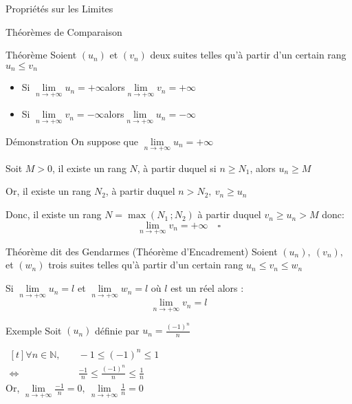 \documentclass{cours}
\begin{document}
    \begin{Gpartie}{Propriétés sur les Limites} 
        \begin{Spartie}{Théorèmes de Comparaison} 
            \begin{SSpartie}{Théorème} 
                Soient $(u_n)$ et $(v_n)$ deux suites telles qu'à partir d'un certain rang $u_n\leq v_n$
                \begin{itemize}
                    \setlength\itemsep{0.5em}
                    \item Si $\lim\limits_{n\to +\infty}u_n=+\infty$\quad alors\quad $\lim\limits_{n\to +\infty}v_n=+\infty$
                    \item Si $\lim\limits_{n\to +\infty}v_n=-\infty$\quad alors\quad $\lim\limits_{n\to +\infty}u_n=-\infty$
                \end{itemize}
            \end{SSpartie}
            \begin{SSpartie}{Démonstration} 
                On suppose que $\lim\limits_{n\to +\infty}u_n=+\infty$

                Soit $M>0$, il existe un rang $N$, à partir duquel si $n\geq N_1$, alors $u_n\geq M$

                Or, il existe un rang $N_2$, à partir duquel $n>N_2,\ v_n\geq u_n$

                Donc, il existe un rang $N=\max(N_1\,;N_2)$ à partir duquel $v_n\geq u_n>M$ donc: \[\lim\limits_{n\to +\infty}v_n=+\infty\quad\square\]
            \end{SSpartie}
            \begin{SSpartie}{Théorème dit des Gendarmes (Théorème d'Encadrement)}
                Soient $(u_n),\ (v_n),$ et $(w_n)$ trois suites telles qu'à partir d'un certain rang $u_n\leq v_n\leq w_n$

                Si $\lim\limits_{n\to +\infty}u_n=l$ et $\lim\limits_{n\to +\infty}w_n=l$ où $l$ est un réel alors :
                \[\lim\limits_{n\to +\infty}v_n=l\]
            \end{SSpartie}
            \begin{SSpartie}{Exemple} 
                Soit $(u_n)$ définie par $u_n=\frac{(-1)^n}{n}$

                $\begin{aligned}[t]
                    \forall n\in\mathbb{N},&\quad-1\leq (-1)^n\leq 1 \\
                    \iff&\quad\frac{-1}{n}\leq\frac{(-1)^n}{n}\leq\frac{1}{n}
                \end{aligned}$ \\[2ex]
                Or, $\lim\limits_{n\to +\infty}\frac{-1}{n}=0,\ \lim\limits_{n\to +\infty}\frac{1}{n}=0$


\end{SSpartie}
\end{Spartie}
\end{Gpartie}
\end{document}
